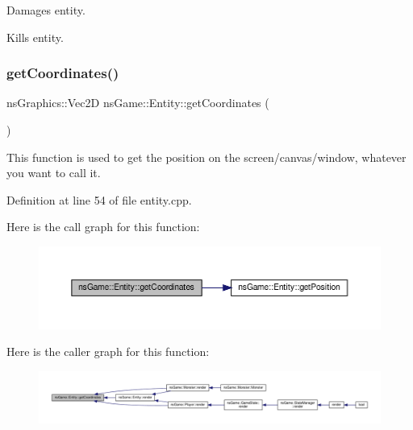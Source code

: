 Damages entity. 

Kills entity. \mbox{\label{structns_game_1_1_entity_a727ed96ea0a27b7232e701ed0ba6d3a4}} 
\subsubsection{\texorpdfstring{get\+Coordinates()}{getCoordinates()}}
{\footnotesize\ttfamily ns\+Graphics\+::\+Vec2D ns\+Game\+::\+Entity\+::get\+Coordinates (\begin{DoxyParamCaption}{ }\end{DoxyParamCaption})}



This function is used to get the position on the screen/canvas/window, whatever you want to call it. 



Definition at line 54 of file entity.\+cpp.

Here is the call graph for this function\+:\nopagebreak
\begin{figure}[H]
\begin{center}
\leavevmode
\includegraphics[width=350pt]{structns_game_1_1_entity_a727ed96ea0a27b7232e701ed0ba6d3a4_cgraph}
\end{center}
\end{figure}
Here is the caller graph for this function\+:\nopagebreak
\begin{figure}[H]
\begin{center}
\leavevmode
\includegraphics[width=350pt]{structns_game_1_1_entity_a727ed96ea0a27b7232e701ed0ba6d3a4_icgraph}
\end{center}
\end{figure}
\mbox{\label{structns_game_1_1_entity_a03b934337b3c013abcccf3dfea6396d1}} 
